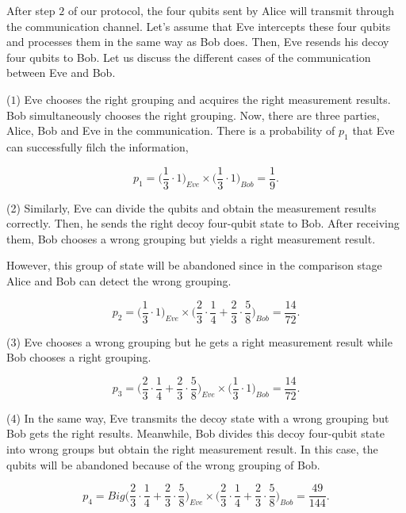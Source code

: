 \documentclass[a4paper,11pt]{article}
\begin{document}
After step $2$ of our protocol, the four qubits sent by Alice will transmit through the communication channel. Let’s assume that Eve intercepts these four qubits and processes
them in the same way as Bob does. Then, Eve resends his decoy four qubits to Bob. Let us discuss the different cases of the communication between Eve and Bob.

($1$) Eve chooses the right grouping and acquires the right measurement results. Bob simultaneously chooses the right grouping. Now, there are three parties, Alice, Bob and Eve
in the communication. There is a probability of $p_1$ that Eve can successfully filch the information,

\begin{equation*}
 p_1 = \Big(\dfrac{1}{3} \cdot 1 \Big)_{Eve} \times  \Big(\dfrac{1}{3} \cdot 1 \Big)_{Bob} = \dfrac{1}{9}.
\end{equation*}

(2) Similarly, Eve can divide the qubits and obtain the measurement results correctly. Then, he sends the right decoy four-qubit state to Bob. After receiving them, Bob chooses a wrong grouping but yields a right measurement result.

However, this group of state will be abandoned since in the comparison stage Alice and Bob can detect the wrong grouping.

\begin{equation*}
p_2 = \Big(\dfrac{1}{3}\cdot 1 \Big)_{Eve} \times \Big(\dfrac{2}{3}\cdot \dfrac{1}{4} + 
\dfrac{2}{3} \cdot \dfrac{5}{8} \Big)_{Bob} = \dfrac{14}{72}.
\end{equation*}

(3) Eve chooses a wrong grouping but he gets a right measurement result while Bob chooses a right grouping.

\begin{equation*}
p_3 = \Big(\dfrac{2}{3}\cdot \dfrac{1}{4} + 
\dfrac{2}{3} \cdot \dfrac{5}{8} \Big)_{Eve} \times \Big( \dfrac{1}{3}\cdot 1 \Big)_{Bob} = \dfrac{14}{72}.
\end{equation*}

(4) In the same way, Eve transmits the decoy state with a wrong grouping but Bob gets the right results. Meanwhile, Bob divides this decoy four-qubit state into wrong groups but
obtain the right measurement result. In this case, the qubits will be abandoned because of the wrong grouping of Bob.

\begin{equation*}
p_4 = Big(\dfrac{2}{3}\cdot \dfrac{1}{4} + 
\dfrac{2}{3} \cdot \dfrac{5}{8} \Big)_{Eve} \times \Big(\dfrac{2}{3}\cdot \dfrac{1}{4} + 
\dfrac{2}{3} \cdot \dfrac{5}{8} \Big)_{Bob} = \dfrac{49}{144}.
\end{equation*}
\end{document}
